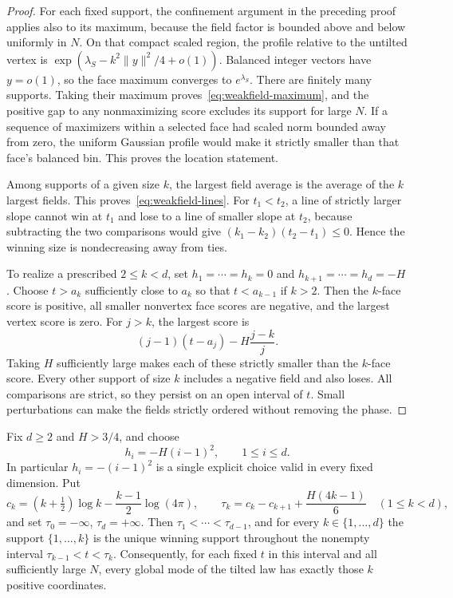 \begin{proof}
For each fixed support, the confinement argument in the preceding proof
applies also to its maximum, because the field factor is bounded above
and below uniformly in $N$. On that compact scaled region, the profile
relative to the untilted vertex is
$\exp(\lambda_S-k^2\|y\|^2/4+o(1))$.
Balanced integer vectors have $y=o(1)$, so the face maximum converges to
$e^{\lambda_S}$. There are finitely many supports. Taking their maximum
proves~\eqref{eq:weakfield-maximum}, and the positive gap to any
nonmaximizing score excludes its support for large $N$. If a sequence of
maximizers within a selected face had scaled norm bounded away from zero,
the uniform Gaussian profile would make it strictly smaller than that
face's balanced bin. This proves the location statement.

Among supports of a given size $k$, the largest field average is the
average of the $k$ largest fields. This proves~\eqref{eq:weakfield-lines}.
For $t_1<t_2$, a line of strictly larger slope cannot win at $t_1$ and
lose to a line of smaller slope at $t_2$, because subtracting the two comparisons
would give $(k_1-k_2)(t_2-t_1)\le0$. Hence the winning size is
nondecreasing away from ties.

To realize a prescribed $2\le k<d$, set $h_1=\cdots=h_k=0$ and
$h_{k+1}=\cdots=h_d=-H$. Choose $t>a_k$ sufficiently close to $a_k$ so
that $t<a_{k-1}$ if $k>2$. Then the $k$-face score is positive, all smaller
nonvertex face scores are negative, and the largest vertex score is zero.
For $j>k$, the largest score is
\[
 (j-1)(t-a_j)-H\frac{j-k}{j}.
\]
Taking $H$ sufficiently large makes each of these strictly smaller than
the $k$-face score. Every other support of size $k$ includes a negative
field and also loses. All comparisons are strict, so they persist on
an open interval of $t$. Small perturbations can make the fields
strictly ordered without removing the phase.
\end{proof}

\begin{corollary}
\label{cor:weakfield-full-hierarchy}
Fix $d\ge2$ and $H>3/4$, and choose
\[
 h_i=-H(i-1)^2,\qquad 1\le i\le d.
\]
In particular $h_i=-(i-1)^2$ is a single explicit choice valid in every
fixed dimension. Put
\[
 c_k=(k+\tfrac12)\log k-\frac{k-1}{2}\log(4\pi),\qquad
 \tau_k=c_k-c_{k+1}+\frac{H(4k-1)}6\quad(1\le k<d),
\]
and set $\tau_0=-\infty$, $\tau_d=+\infty$. Then
$\tau_1<\cdots<\tau_{d-1}$, and for every $k\in\{1,\ldots,d\}$ the
support $\{1,\ldots,k\}$ is the unique winning support throughout the
nonempty interval $\tau_{k-1}<t<\tau_k$. Consequently, for each fixed
$t$ in this interval and all sufficiently large $N$, every global mode
of the tilted law has exactly those $k$ positive coordinates.
\end{corollary}


